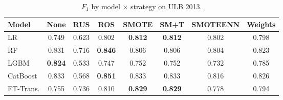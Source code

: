 \begin{table}[H]
\centering
\caption{$F_1$ by model $\times$ strategy on ULB 2013.}
\label{tab:factorial_ulb_f1}
\begin{tabular}{l c c c c c c c}
\toprule
Model & None & RUS & ROS & SMOTE & SM+T & SMOTEENN & Weights \\
\midrule
LR         & 0.749 & 0.623 & 0.802 & \textbf{0.812} & \textbf{0.812} & 0.802 & 0.798 \\
RF         & 0.831 & 0.716 & \textbf{0.846} & 0.806 & 0.806 & 0.804 & 0.823 \\
LGBM       & \textbf{0.824} & 0.533 & 0.747 & 0.752 & 0.752 & 0.732 & 0.785 \\
CatBoost   & 0.833 & 0.568 & \textbf{0.851} & 0.833 & 0.833 & 0.816 & 0.826 \\
FT-Trans.  & 0.755 & 0.736 & 0.810 & \textbf{0.829} & \textbf{0.829} & 0.778 & 0.794 \\
\bottomrule
\end{tabular}
\end{table}